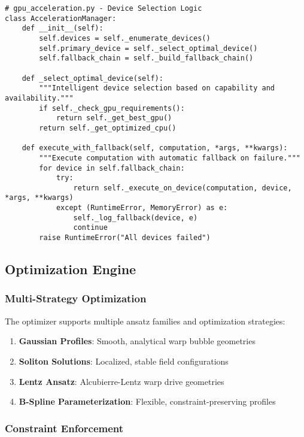 \documentclass{article}
\begin{document}
\begin{lstlisting}
# gpu_acceleration.py - Device Selection Logic
class AccelerationManager:
    def __init__(self):
        self.devices = self._enumerate_devices()
        self.primary_device = self._select_optimal_device()
        self.fallback_chain = self._build_fallback_chain()
    
    def _select_optimal_device(self):
        """Intelligent device selection based on capability and availability."""
        if self._check_gpu_requirements():
            return self._get_best_gpu()
        return self._get_optimized_cpu()
    
    def execute_with_fallback(self, computation, *args, **kwargs):
        """Execute computation with automatic fallback on failure."""
        for device in self.fallback_chain:
            try:
                return self._execute_on_device(computation, device, *args, **kwargs)
            except (RuntimeError, MemoryError) as e:
                self._log_fallback(device, e)
                continue
        raise RuntimeError("All devices failed")
\end{lstlisting}

\subsection{Optimization Engine}

\subsubsection{Multi-Strategy Optimization}

The optimizer supports multiple ansatz families and optimization strategies:

\begin{enumerate}
\item \textbf{Gaussian Profiles}: Smooth, analytical warp bubble geometries
\item \textbf{Soliton Solutions}: Localized, stable field configurations
\item \textbf{Lentz Ansatz}: Alcubierre-Lentz warp drive geometries
\item \textbf{B-Spline Parameterization}: Flexible, constraint-preserving profiles
\end{enumerate}

\subsubsection{Constraint Enforcement}
\end{document}
